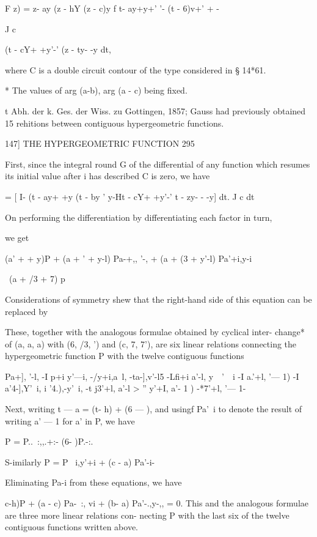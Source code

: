 F z) =  z- ay (z - hY (z - c)y f  t- ay+y+' '-  (t - 6)v+' +  -  

J c 

(t - cY+ +y'-' (z - ty- -y dt, 

where C is a double circuit contour of the type considered in § 14*61. 

* The values of arg (a-b), arg (a - c) being fixed. 

t Abh. der k. Ges. der Wiss. zu Gottingen, 1857; Gauss had previously obtained 15 rehitions 
between contiguous hypergeometric functions. 



147] THE HYPERGEOMETRIC FUNCTION 295 

First, since the integral round G of the differential of any function which 
resumes its initial value after i has described C is zero, we have 

= [ I-  (t - ay+ +y (t - by ' y-Ht - cY+ +y'-'   t - zy- - -y] dt. 
J c dt 

On performing the differentiation by differentiating each factor in turn, 

we get 

(a' + + y)P + (a +  ' + y-l) Pa-+,, '-, + (a + (3 + y'-l) Pa'+i,y-i 

\  (a + /3 + 7) p 

Considerations of symmetry shew that the right-hand side of this 
equation can be replaced by 

These, together with the analogous formulae obtained by cyclical inter- 
change* of (a, a, a) with (6, /3,  ') and (c, 7, 7'), are six linear relations 
connecting the hypergeometric function P with the twelve contiguous 
functions 

Pa+], '-l, -I p+i y'—i, -/y+i,a\ l, -ta-],v'-l5 -Lfi+i a'-l,  y~\, '~\ i 
-I a.'+l, '— 1) -I a'4-],Y'\ i, i  '4.),-y'\ i, -t j3'+l, a'-l >  '' y'+I, a'- 1 ) -*7'+l, '— 1- 

Next, writing t — a = (t- h) + (6 —  ), and usingf Pa'\ i to denote the result 
of writing a' — 1 for a' in P, we have 

P = P..\ :,,.+:- (6- )P.-:. 

S-imilarly P = P \ i,y'+i + (c - a) Pa'-i- 

Eliminating Pa-i from these equations, we have 

 c-h)P + (a - c) Pa-\ :, vi + (b- a) Pa'-.,y-,, = 0. 
This and the analogous formulae are three more linear relations con- 
necting P with the last six of the twelve contiguous functions written above. 

